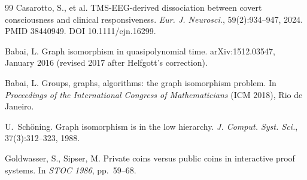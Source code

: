 \documentclass[11pt,a4paper]{amsart}
\theoremstyle{plain}
\theoremstyle{definition}
\begin{document}
\begin{thebibliography}{99}
Casarotto, S., et al.
\newblock TMS-EEG-derived dissociation between covert consciousness and clinical responsiveness.
\newblock \emph{Eur. J. Neurosci.}, 59(2):934--947, 2024. PMID 38440949. DOI 10.1111/ejn.16299.

Babai, L.
\newblock Graph isomorphism in quasipolynomial time.
\newblock arXiv:1512.03547, January 2016 (revised 2017 after Helfgott's correction).

Babai, L.
\newblock Groups, graphs, algorithms: the graph isomorphism problem.
\newblock In \emph{Proceedings of the International Congress of Mathematicians} (ICM 2018), Rio de Janeiro.

U.~Sch\"oning.
\newblock Graph isomorphism is in the low hierarchy.
\newblock \emph{J. Comput. Syst. Sci.}, 37(3):312--323, 1988.

Goldwasser, S., Sipser, M.
\newblock Private coins versus public coins in interactive proof systems.
\newblock In \emph{STOC 1986}, pp.~59--68.

\end{thebibliography}
\end{document}
